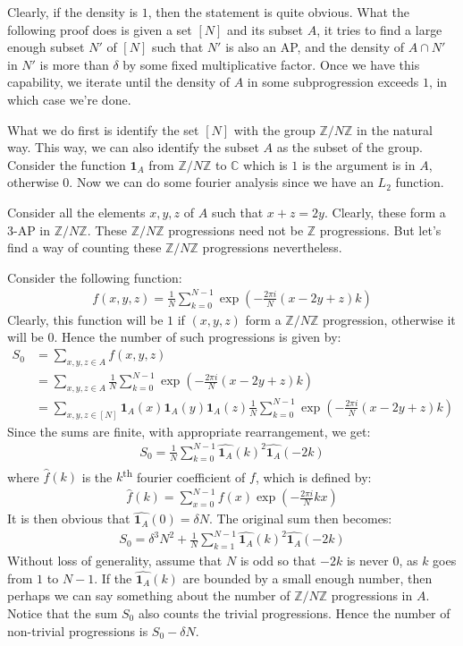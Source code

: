 \documentclass{article}
\theoremstyle{definition}
\newcommand{\integer}{\mathbb{Z}}
\newcommand{\znz}{\mathbb{Z}/N\mathbb{Z}}
\newcommand{\indi}{\mathbf{1}_A}
\begin{document}
Clearly, if the density is $1$, then the statement is quite obvious. What the following proof does is given a set $[N]$ and its subset $A$, it tries to find a large enough subset $N'$ of $[N]$ such that $N'$ is also an AP, and the density of $A \cap N'$ in $N'$ is more than $\delta$ by some fixed multiplicative factor. Once we have this capability, we iterate until the density of $A$ in some subprogression exceeds $1$, in which case we're done.

What we do first is identify the set $[N]$ with the group $\mathbb{Z}/N\mathbb{Z}$ in the natural way. This way, we can also identify the subset $A$ as the subset of the group. Consider the function $\mathbf{1}_A$ from $\mathbb{Z}/N\mathbb{Z}$ to $\mathbb{C}$ which is $1$ is the argument is in $A$, otherwise $0$. Now we can do some fourier analysis since we have an $L_2$ function.

Consider all the elements $x,y,z$ of $A$ such that $x+z = 2y$. Clearly, these form a 3-AP in $\mathbb{Z}/N\mathbb{Z}$. These $\mathbb{Z}/N\mathbb{Z}$ progressions need not be $\integer$ progressions. But let's find a way of counting these $\znz$ progressions nevertheless.

Consider the following function:
\begin{align*}
    f(x,y,z) = \frac{1}{N}\sum_{k=0}^{N-1} \exp\left(-\frac{2\pi i}{N}(x -2y +z)k\right)
\end{align*}
Clearly, this function will be $1$ if $(x,y,z)$ form a $\znz$ progression, otherwise it will be $0$. Hence the number of such progressions is given by:
\begin{align*}
    S_0 &= \sum_{x,y,z \in A}f(x,y,z) \\
    &= \sum_{x,y,z \in A} \frac{1}{N}\sum_{k=0}^{N-1} \exp\left(-\frac{2\pi i}{N}(x -2y +z)k\right) \\
    &= \sum_{x,y,z \in [N]} \indi(x)\indi(y)\indi(z) \frac{1}{N}\sum_{k=0}^{N-1} \exp\left(-\frac{2\pi i}{N}(x -2y +z)k\right)
\end{align*}
Since the sums are finite, with appropriate rearrangement, we get:
\begin{align*}
    S_0 = \frac{1}{N} \sum_{k=0}^{N-1} \widehat{\indi}(k)^2 \widehat{\indi}(-2k)
\end{align*}
where $\widehat{f}(k)$ is the $k$\textsuperscript{th} fourier coefficient of $f$, which is defined by:
\begin{align*}
    \widehat{f}(k) = \sum_{x=0}^{N-1} f(x) \exp\left(-\frac{2\pi i}{N}kx\right)    
\end{align*}
It is then obvious that $\widehat{\indi}(0) = \delta N$. The original sum then becomes:
\begin{align*}
    S_0 = \delta^3 N^2 + \frac{1}{N} \sum_{k=1}^{N-1} \widehat{\indi}(k)^2 \widehat{\indi}(-2k)
\end{align*}
Without loss of generality, assume that $N$ is odd so that $-2k$ is never $0$, as $k$ goes from $1$ to $N-1$. If the $\widehat{\indi}(k)$ are bounded by a small enough number, then perhaps we can say something about the number of $\znz$ progressions in $A$. Notice that the sum $S_0$ also counts the trivial progressions. Hence the number of non-trivial progressions is $S_0 - \delta N$.
\end{document}
